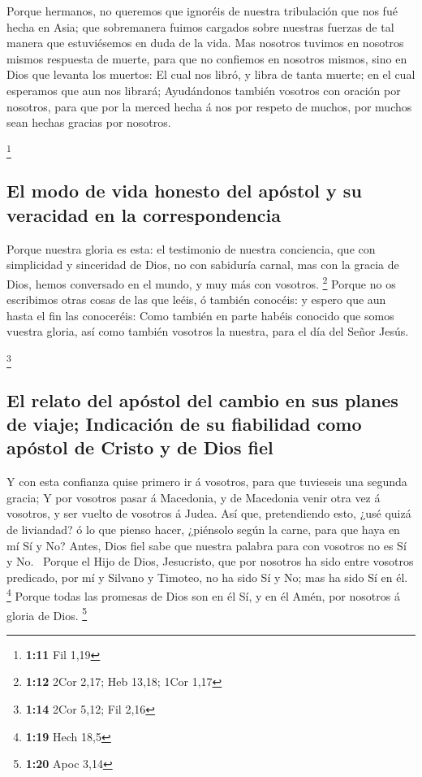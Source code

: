  Porque hermanos, no queremos que ignoréis de nuestra
tribulación que nos fué hecha en Asia; que sobremanera fuimos cargados
sobre nuestras fuerzas de tal manera que estuviésemos en duda de la
vida.  Mas nosotros tuvimos en nosotros mismos respuesta de
muerte, para que no confiemos en nosotros mismos, sino en Dios que
levanta los muertos:  El cual nos libró, y libra de tanta
muerte; en el cual esperamos que aun nos librará; 
Ayudándonos también vosotros con oración por nosotros, para que por la
merced hecha á nos por respeto de muchos, por muchos sean hechas gracias
por nosotros.

\footnote{\textbf{1:11} Fil 1,19}

\hypertarget{el-modo-de-vida-honesto-del-apuxf3stol-y-su-veracidad-en-la-correspondencia}{%
\subsection{El modo de vida honesto del apóstol y su veracidad en la
correspondencia}\label{el-modo-de-vida-honesto-del-apuxf3stol-y-su-veracidad-en-la-correspondencia}}

 Porque nuestra gloria es esta: el testimonio de nuestra
conciencia, que con simplicidad y sinceridad de Dios, no con sabiduría
carnal, mas con la gracia de Dios, hemos conversado en el mundo, y muy
más con vosotros. \footnote{\textbf{1:12} 2Cor 2,17; Heb 13,18; 1Cor
  1,17}  Porque no os escribimos otras cosas de las que
leéis, ó también conocéis: y espero que aun hasta el fin las conoceréis:
 Como también en parte habéis conocido que somos vuestra
gloria, así como también vosotros la nuestra, para el día del Señor
Jesús.

\footnote{\textbf{1:14} 2Cor 5,12; Fil 2,16}

\hypertarget{el-relato-del-apuxf3stol-del-cambio-en-sus-planes-de-viaje-indicaciuxf3n-de-su-fiabilidad-como-apuxf3stol-de-cristo-y-de-dios-fiel}{%
\subsection{El relato del apóstol del cambio en sus planes de viaje;
Indicación de su fiabilidad como apóstol de Cristo y de Dios
fiel}\label{el-relato-del-apuxf3stol-del-cambio-en-sus-planes-de-viaje-indicaciuxf3n-de-su-fiabilidad-como-apuxf3stol-de-cristo-y-de-dios-fiel}}

 Y con esta confianza quise primero ir á vosotros, para que
tuvieseis una segunda gracia;  Y por vosotros pasar á
Macedonia, y de Macedonia venir otra vez á vosotros, y ser vuelto de
vosotros á Judea.  Así que, pretendiendo esto, ¿usé quizá
de liviandad? ó lo que pienso hacer, ¿piénsolo según la carne, para que
haya en mí Sí y No?  Antes, Dios fiel sabe que nuestra
palabra para con vosotros no es Sí y No.~ Porque el Hijo de
Dios, Jesucristo, que por nosotros ha sido entre vosotros predicado, por
mí y Silvano y Timoteo, no ha sido Sí y No; mas ha sido Sí en él.
\footnote{\textbf{1:19} Hech 18,5}  Porque todas las
promesas de Dios son en él Sí, y en él Amén, por nosotros á gloria de
Dios. \footnote{\textbf{1:20} Apoc 3,14}

